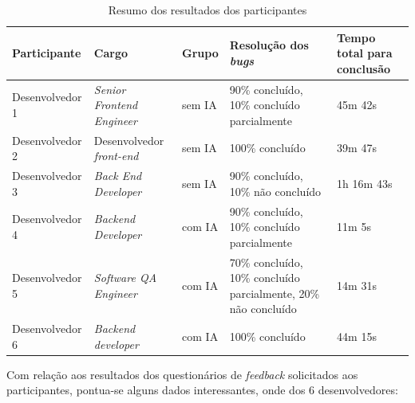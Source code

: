 \documentclass[english,brazilian]{UNISINOSartigo} %
\begin{document}
\begin{table}[ht]
    \caption{Resumo dos resultados dos participantes}
    \label{tab:resumo_resultados_participantes}
    \centering%
    \footnotesize
    \begin{tabularx}{\textwidth}{XXXXX}
        \toprule
        \textbf{Participante} & \textbf{Cargo} & \textbf{Grupo} & \textbf{Resolução dos \textit{bugs}} & \textbf{Tempo total para conclusão} \\
        \midrule
        Desenvolvedor 1 & \textit{Senior Frontend Engineer} & sem IA & 90\% concluído, 10\% concluído parcialmente & 45m 42s \\
        \midrule
        Desenvolvedor 2 & Desenvolvedor \textit{front-end} & sem IA & 100\% concluído & 39m 47s \\
        \midrule
        Desenvolvedor 3 & \textit{Back End Developer} & sem IA & 90\% concluído, 10\% não concluído & 1h 16m 43s \\
        \midrule
        Desenvolvedor 4 & \textit{Backend Developer} & com IA & 90\% concluído, 10\% concluído parcialmente & 11m 5s \\
        \midrule
        Desenvolvedor 5 & \textit{Software QA Engineer} & com IA & 70\% concluído, 10\% concluído parcialmente, 20\% não concluído & 14m 31s \\
        \midrule
        Desenvolvedor 6 & \textit{Backend developer} & com IA & 100\% concluído & 44m 15s \\
        \bottomrule
    \end{tabularx}
\end{table}
\FloatBarrier

Com relação aos resultados dos questionários de \textit{feedback} solicitados aos participantes, pontua-se alguns dados interessantes, onde dos 6 desenvolvedores:
\end{document}
